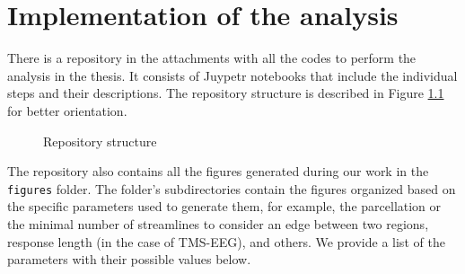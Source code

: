\chapter{Implementation of the analysis}

There is a repository in the attachments with all the codes to perform the analysis in the thesis. It consists of Juypetr notebooks that include the individual steps and their descriptions. The repository structure is described in Figure \ref{fig:repo-structure} for better orientation. 

\begin{figure}[!h]
\centering
\begin{minipage}{0.9\textwidth}
    \end{minipage}
    \caption{Repository structure}
    \label{fig:repo-structure}
\end{figure}

The repository also contains all the figures generated during our work in the \texttt{figures} folder. The folder's subdirectories contain the figures organized based on the specific parameters used to generate them, for example, the parcellation or the minimal number of streamlines to consider an edge between two regions, response length (in the case of TMS-EEG), and others. We provide a list of the parameters with their possible values below.

\newpage

